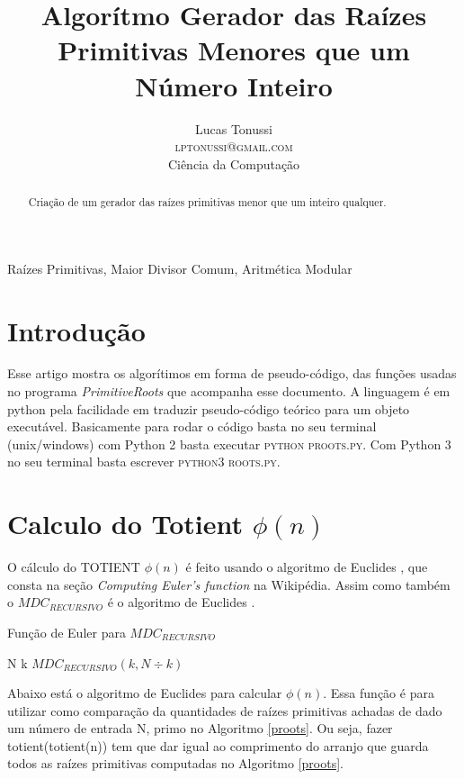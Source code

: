 \documentclass[conference]{IEEEtran}
\title{Algorítmo Gerador das Raízes Primitivas Menores que um Número Inteiro}
\author {
  Lucas Tonussi\\
  \textsc{lptonussi@gmail.com}\\
  \small{Ciência da Computação}
}
\begin{document}
\maketitle

\begin{abstract}
Criação de um gerador das raízes primitivas menor que um inteiro qualquer.
\end{abstract}

\IEEEoverridecommandlockouts

\begin{keywords}
Raízes Primitivas, Maior Divisor Comum, Aritmética Modular
\end{keywords}

\IEEEpeerreviewmaketitle

\section{Introdução}

Esse artigo mostra os algorítimos em forma de pseudo-código, das funções usadas
no programa \textit{PrimitiveRoots} que acompanha esse documento. A linguagem é
em python pela facilidade em traduzir pseudo-código teórico para um objeto
executável. Basicamente para rodar o código basta no seu terminal (unix/windows)
com Python 2 basta executar \textsc{python proots.py}. Com Python 3 no seu
terminal basta escrever \textsc{python3 roots.py}.

\section{Calculo do Totient $\phi(n)$}

O cálculo do TOTIENT $\phi(n)$ é feito usando o algoritmo de Euclides
\cite{totient}, que consta na seção \textit{Computing Euler's function} na
Wikipédia. Assim como também o $MDC_{RECURSIVO}$ é o algoritmo de Euclides
\cite{gcd}.

\begin{algorithm}
  \caption{Função de Euler para $MDC_{RECURSIVO}$}\label{gcd}
  \begin{algorithmic}
        \State \Return N
      \EndIf
        \State \Return k
      \EndIf
      \Return $MDC_{RECURSIVO}(k, N \div k)$
    \EndFunction
  \end{algorithmic}
\end{algorithm}

Abaixo está o algoritmo de Euclides para calcular $\phi(n)$. Essa função é para
utilizar como comparação da quantidades de raízes primitivas achadas de dado um
número de entrada N, primo no Algoritmo \ref{proots}. Ou seja, fazer
totient(totient(n)) tem que dar igual ao comprimento do arranjo que guarda todos
as raízes primitivas computadas no Algoritmo \ref{proots}.
\end{document}

